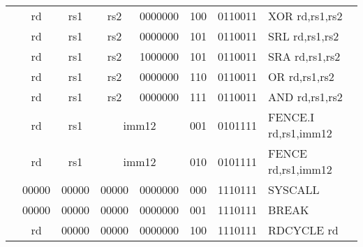 \begin{table}[p]
\begin{small}
\begin{center}
\begin{tabular}{rccccccccccl}
&
\multicolumn{1}{|c|}{rd} &
\multicolumn{1}{c|}{rs1} &
\multicolumn{1}{c|}{rs2} &
\multicolumn{4}{c|}{0000000} &
\multicolumn{2}{c|}{100} &
\multicolumn{1}{c|}{0110011} & XOR rd,rs1,rs2 \\
\cline{2-11}
  

&
\multicolumn{1}{|c|}{rd} &
\multicolumn{1}{c|}{rs1} &
\multicolumn{1}{c|}{rs2} &
\multicolumn{4}{c|}{0000000} &
\multicolumn{2}{c|}{101} &
\multicolumn{1}{c|}{0110011} & SRL rd,rs1,rs2 \\
\cline{2-11}
  

&
\multicolumn{1}{|c|}{rd} &
\multicolumn{1}{c|}{rs1} &
\multicolumn{1}{c|}{rs2} &
\multicolumn{4}{c|}{1000000} &
\multicolumn{2}{c|}{101} &
\multicolumn{1}{c|}{0110011} & SRA rd,rs1,rs2 \\
\cline{2-11}
  

&
\multicolumn{1}{|c|}{rd} &
\multicolumn{1}{c|}{rs1} &
\multicolumn{1}{c|}{rs2} &
\multicolumn{4}{c|}{0000000} &
\multicolumn{2}{c|}{110} &
\multicolumn{1}{c|}{0110011} & OR rd,rs1,rs2 \\
\cline{2-11}
  

&
\multicolumn{1}{|c|}{rd} &
\multicolumn{1}{c|}{rs1} &
\multicolumn{1}{c|}{rs2} &
\multicolumn{4}{c|}{0000000} &
\multicolumn{2}{c|}{111} &
\multicolumn{1}{c|}{0110011} & AND rd,rs1,rs2 \\
\cline{2-11}
  

&
\multicolumn{1}{|c|}{rd} &
\multicolumn{1}{c|}{rs1} &
\multicolumn{5}{c|}{imm12} &
\multicolumn{2}{c|}{001} &
\multicolumn{1}{c|}{0101111} & FENCE.I rd,rs1,imm12 \\
\cline{2-11}
  

&
\multicolumn{1}{|c|}{rd} &
\multicolumn{1}{c|}{rs1} &
\multicolumn{5}{c|}{imm12} &
\multicolumn{2}{c|}{010} &
\multicolumn{1}{c|}{0101111} & FENCE rd,rs1,imm12 \\
\cline{2-11}
  

&
\multicolumn{1}{|c|}{00000} &
\multicolumn{1}{c|}{00000} &
\multicolumn{1}{c|}{00000} &
\multicolumn{4}{c|}{0000000} &
\multicolumn{2}{c|}{000} &
\multicolumn{1}{c|}{1110111} & SYSCALL  \\
\cline{2-11}
  

&
\multicolumn{1}{|c|}{00000} &
\multicolumn{1}{c|}{00000} &
\multicolumn{1}{c|}{00000} &
\multicolumn{4}{c|}{0000000} &
\multicolumn{2}{c|}{001} &
\multicolumn{1}{c|}{1110111} & BREAK  \\
\cline{2-11}
  

&
\multicolumn{1}{|c|}{rd} &
\multicolumn{1}{c|}{00000} &
\multicolumn{1}{c|}{00000} &
\multicolumn{4}{c|}{0000000} &
\multicolumn{2}{c|}{100} &
\multicolumn{1}{c|}{1110111} & RDCYCLE rd \\
\cline{2-11}
  


\end{tabular}
\end{center}
\end{small}
\end{table}
